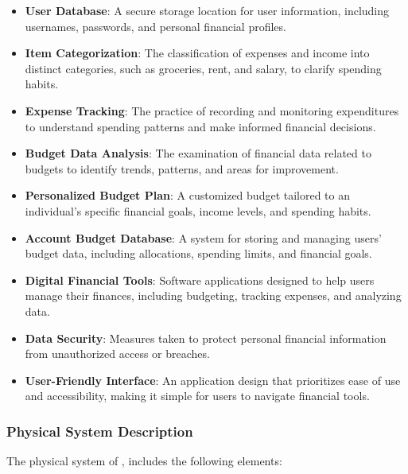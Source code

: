 \documentclass[12pt]{article}
\begin{document}
\begin{itemize}
  \item \textbf{User Database}: A secure storage location for user information,
  including usernames, passwords, and personal financial profiles.
  \item \textbf{Item Categorization}: The classification of expenses and income
  into distinct categories, such as groceries, rent, and salary, to clarify
  spending habits.
  \item \textbf{Expense Tracking}: The practice of recording and monitoring
  expenditures to understand spending patterns and make informed financial
  decisions.
  \item \textbf{Budget Data Analysis}: The examination of financial data related
  to budgets to identify trends, patterns, and areas for improvement.
  \item \textbf{Personalized Budget Plan}: A customized budget tailored to an
  individual's specific financial goals, income levels, and spending habits.
  \item \textbf{Account Budget Database}: A system for storing and managing
  users' budget data, including allocations, spending limits, and financial
  goals.
  \item \textbf{Digital Financial Tools}: Software applications designed to help
  users manage their finances, including budgeting, tracking expenses, and
  analyzing data.
  \item \textbf{Data Security}: Measures taken to protect personal financial
  information from unauthorized access or breaches.
  \item \textbf{User-Friendly Interface}: An application design that prioritizes
  ease of use and accessibility, making it simple for users to navigate
  financial tools.
\end{itemize}



\subsubsection{Physical System Description} \label{sec_phySystDescrip}

The physical system of \progname{}, includes the following elements: \\
\end{document}
